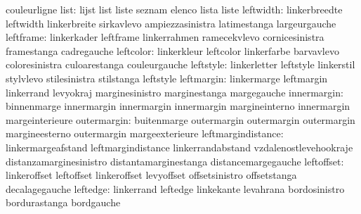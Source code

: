                            couleurligne
                     list: lijst                     list
                           liste                     seznam
                           elenco                    lista
                           liste
                leftwidth: linkerbreedte             leftwidth
                           linkerbreite              sirkavlevo
                           ampiezzasinistra          latimestanga
                           largeurgauche
                leftframe: linkerkader               leftframe
                           linkerrahmen              ramecekvlevo
                           cornicesinistra           framestanga
                           cadregauche
                leftcolor: linkerkleur               leftcolor
                           linkerfarbe               barvavlevo
                           coloresinistra            culoarestanga
                           couleurgauche
                leftstyle: linkerletter              leftstyle
                           linkerstil                stylvlevo
                           stilesinistra             stilstanga
                           leftstyle
               leftmargin: linkermarge               leftmargin
                           linkerrand                levyokraj
                           marginesinistro           marginestanga
                           margegauche
              innermargin: binnenmarge               innermargin
                           innermargin               innermargin
                           margineinterno            innermargin
                           margeinterieure
              outermargin: buitenmarge               outermargin
                           outermargin               outermargin
                           margineesterno            outermargin
                           margeexterieure
       leftmargindistance: linkermargeafstand        leftmargindistance
                           linkerrandabstand         vzdalenostlevehookraje
                           distanzamarginesinistro   distantamarginestanga
                           distancemargegauche
               leftoffset: linkeroffset              leftoffset
                           linkeroffset              levyoffset
                           offsetsinistro            offsetstanga
                           decalagegauche
                 leftedge: linkerrand                leftedge
                           linkekante                levahrana
                           bordosinistro             bordurastanga
                           bordgauche
